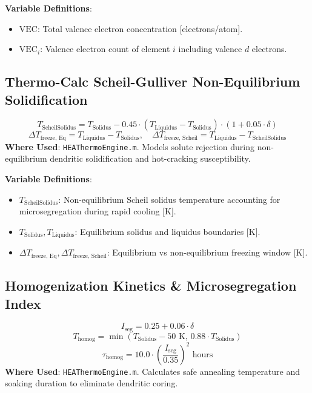 \documentclass[11pt,a4paper]{article}
\begin{document}
\noindent\textbf{Variable Definitions}:
\begin{itemize}
  \item $\text{VEC}$: Total valence electron concentration [electrons/atom].
  \item $\text{VEC}_i$: Valence electron count of element $i$ including valence $d$ electrons.
\end{itemize}

\subsection{Thermo-Calc Scheil-Gulliver Non-Equilibrium Solidification}
\begin{equation}
T_{\text{ScheilSolidus}} = T_{\text{Solidus}} - 0.45 \cdot (T_{\text{Liquidus}} - T_{\text{Solidus}}) \cdot (1 + 0.05 \cdot \delta)
\end{equation}
\begin{equation}
\Delta T_{\text{freeze, Eq}} = T_{\text{Liquidus}} - T_{\text{Solidus}}, \quad \Delta T_{\text{freeze, Scheil}} = T_{\text{Liquidus}} - T_{\text{ScheilSolidus}}
\end{equation}
\textbf{Where Used}: \texttt{HEAThermoEngine.m}. Models solute rejection during non-equilibrium dendritic solidification and hot-cracking susceptibility.

\noindent\textbf{Variable Definitions}:
\begin{itemize}
  \item $T_{\text{ScheilSolidus}}$: Non-equilibrium Scheil solidus temperature accounting for microsegregation during rapid cooling [$\text{K}$].
  \item $T_{\text{Solidus}}, T_{\text{Liquidus}}$: Equilibrium solidus and liquidus boundaries [$\text{K}$].
  \item $\Delta T_{\text{freeze, Eq}}, \Delta T_{\text{freeze, Scheil}}$: Equilibrium vs non-equilibrium freezing window [$\text{K}$].
\end{itemize}

\subsection{Homogenization Kinetics \& Microsegregation Index}
\begin{equation}
I_{\text{seg}} = 0.25 + 0.06 \cdot \delta
\end{equation}
\begin{equation}
T_{\text{homog}} = \min\left(T_{\text{Solidus}} - 50 \text{ K}, \, 0.88 \cdot T_{\text{Solidus}}\right)
\end{equation}
\begin{equation}
\tau_{\text{homog}} = 10.0 \cdot \left(\frac{I_{\text{seg}}}{0.35}\right)^2 \text{ hours}
\end{equation}
\textbf{Where Used}: \texttt{HEAThermoEngine.m}. Calculates safe annealing temperature and soaking duration to eliminate dendritic coring.
\end{document}
